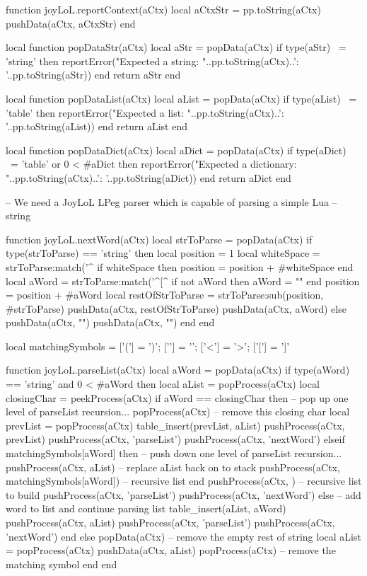 function joyLoL.reportContext(aCtx)
  local aCtxStr = pp.toString(aCtx)
  pushData(aCtx, aCtxStr)
end

local function popDataStr(aCtx)
  local aStr = popData(aCtx)
  if type(aStr) ~= 'string' then
    reportError("Expected a string\naCtx: "..pp.toString(aCtx)..'\naStr: '..pp.toString(aStr))
  end
  return aStr
end

local function popDataList(aCtx)
  local aList = popData(aCtx)
  if type(aList) ~= 'table' then
    reportError("Expected a list\naCtx: "..pp.toString(aCtx)..'\naList: '..pp.toString(aList))
  end
  return aList
end

local function popDataDict(aCtx)
  local aDict = popData(aCtx)
  if type(aDict) ~= 'table' or 0 < #aDict then
    reportError("Expected a dictionary\naCtx: "..pp.toString(aCtx)..'\naDict: '..pp.toString(aDict))
  end
  return aDict
end

-- We need a JoyLoL LPeg parser which is capable of parsing a simple Lua 
-- string 

function joyLoL.nextWord(aCtx)
  local strToParse = popData(aCtx)
  if type(strToParse) == 'string' then
    local position = 1
    local whiteSpace = strToParse:match('^%
    if whiteSpace then position = position + #whiteSpace end
    local aWord = strToParse:match('^[^%
    if not aWord then aWord = "" end
    position = position + #aWord
    local restOfStrToParse = strToParse:sub(position, #strToParse)
    pushData(aCtx, restOfStrToParse)
    pushData(aCtx, aWord)
  else
    pushData(aCtx, "")
    pushData(aCtx, "")
  end
end

local matchingSymbols = {
  ['('] = ')';
  ['{'] = '}';
  ['<'] = '>';
  ['['] = ']'
}

function joyLoL.parseList(aCtx)
  local aWord = popData(aCtx)
  if type(aWord) == 'string' and 0 < #aWord then
    local aList = popProcess(aCtx)
    local closingChar = peekProcess(aCtx)
    if aWord == closingChar then
      -- pop up one level of parseList recursion...
      popProcess(aCtx)       -- remove this closing char
      local prevList = popProcess(aCtx)
      table_insert(prevList, aList)
      pushProcess(aCtx, prevList)
      pushProcess(aCtx, 'parseList')
      pushProcess(aCtx, 'nextWord')
    elseif matchingSymbols[aWord] then
      -- push down one level of parseList recursion...
      pushProcess(aCtx, aList) -- replace aList back on to stack
      pushProcess(aCtx, matchingSymbols[aWord]) -- recursive list end
      pushProcess(aCtx, {})                     -- recursive list to build
      pushProcess(aCtx, 'parseList')
      pushProcess(aCtx, 'nextWord')
    else
      -- add word to list and continue parsing list
      table_insert(aList, aWord)
      pushProcess(aCtx, aList)
      pushProcess(aCtx, 'parseList')
      pushProcess(aCtx, 'nextWord')
    end
  else
    popData(aCtx) -- remove the empty rest of string
    local aList = popProcess(aCtx)
    pushData(aCtx, aList)
    popProcess(aCtx) -- remove the matching symbol
  end
end


